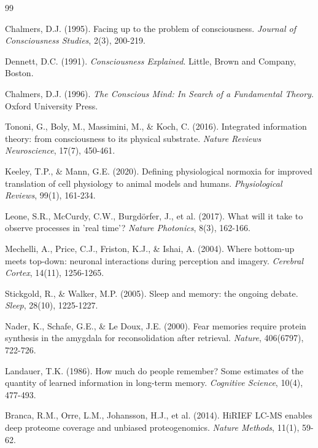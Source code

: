 \documentclass[11pt,a4paper]{article}
\begin{document}

\begin{thebibliography}{99}

Chalmers, D.J. (1995). Facing up to the problem of consciousness. \textit{Journal of Consciousness Studies}, 2(3), 200-219.

Dennett, D.C. (1991). \textit{Consciousness Explained}. Little, Brown and Company, Boston.

Chalmers, D.J. (1996). \textit{The Conscious Mind: In Search of a Fundamental Theory}. Oxford University Press.

Tononi, G., Boly, M., Massimini, M., \& Koch, C. (2016). Integrated information theory: from consciousness to its physical substrate. \textit{Nature Reviews Neuroscience}, 17(7), 450-461.


Keeley, T.P., \& Mann, G.E. (2020). Defining physiological normoxia for improved translation of cell physiology to animal models and humans. \textit{Physiological Reviews}, 99(1), 161-234.

Leone, S.R., McCurdy, C.W., Burgdörfer, J., et al. (2017). What will it take to observe processes in 'real time'? \textit{Nature Photonics}, 8(3), 162-166.

Mechelli, A., Price, C.J., Friston, K.J., \& Ishai, A. (2004). Where bottom-up meets top-down: neuronal interactions during perception and imagery. \textit{Cerebral Cortex}, 14(11), 1256-1265.

Stickgold, R., \& Walker, M.P. (2005). Sleep and memory: the ongoing debate. \textit{Sleep}, 28(10), 1225-1227.

Nader, K., Schafe, G.E., \& Le Doux, J.E. (2000). Fear memories require protein synthesis in the amygdala for reconsolidation after retrieval. \textit{Nature}, 406(6797), 722-726.

Landauer, T.K. (1986). How much do people remember? Some estimates of the quantity of learned information in long-term memory. \textit{Cognitive Science}, 10(4), 477-493.

Branca, R.M., Orre, L.M., Johansson, H.J., et al. (2014). HiRIEF LC-MS enables deep proteome coverage and unbiased proteogenomics. \textit{Nature Methods}, 11(1), 59-62.


\end{thebibliography}
\end{document}

